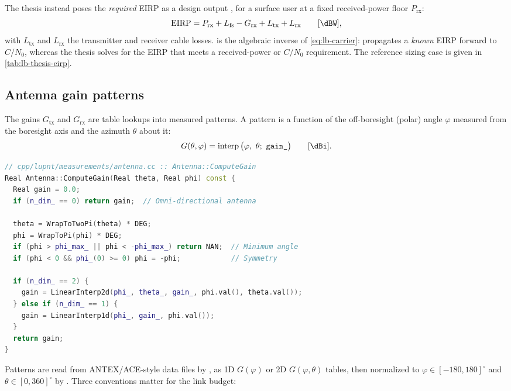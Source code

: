 The thesis instead poses the \emph{required} EIRP as a design output
\citep[Ch.~3.3, Eq.~(3.17)]{iiyama2026thesis}, for a surface user at a fixed
received-power floor $P_\mathrm{rx}$:
\begin{equation}
  \mathrm{EIRP}
  =
  P_\mathrm{rx}
  + L_\mathrm{fs}
  - G_\mathrm{rx}
  + L_\mathrm{tx}
  + L_\mathrm{rx}
  \qquad [\si{\dBW}],
  \label{eq:lb-eirp-required}
\end{equation}
with $L_\mathrm{tx}$ and $L_\mathrm{rx}$ the transmitter and receiver cable
losses.   is the algebraic inverse of
\cref{eq:lb-carrier}: \lupnt{} propagates a \emph{known} EIRP forward to
$C/N_0$, whereas the thesis solves for the EIRP that meets a received-power or
$C/N_0$ requirement.  The reference sizing case is given in
\cref{tab:lb-thesis-eirp}.

\subsection{Antenna gain patterns}
\label{sec:lb-gain}

The gains $G_\mathrm{tx}$ and $G_\mathrm{rx}$ are table lookups into measured
patterns.  A pattern is a function of the off-boresight (polar) angle
$\varphi$ measured from the boresight axis and the azimuth $\theta$ about it:
\begin{equation}
  G(\theta, \varphi)
  =
  \operatorname{interp}\big(\varphi,\ \theta;\ \code{gain\_}\big)
  \qquad [\si{\dBi}].
  \label{eq:lb-gain}
\end{equation}

\begin{lstlisting}[language=cpp, caption={Pattern lookup with the coverage cut
and the mirror-symmetry fold.}, label={lst:lb-gain}]
// cpp/lupnt/measurements/antenna.cc :: Antenna::ComputeGain
Real Antenna::ComputeGain(Real theta, Real phi) const {
  Real gain = 0.0;
  if (n_dim_ == 0) return gain;  // Omni-directional antenna

  theta = WrapToTwoPi(theta) * DEG;
  phi = WrapToPi(phi) * DEG;
  if (phi > phi_max_ || phi < -phi_max_) return NAN;  // Minimum angle
  if (phi < 0 && phi_(0) >= 0) phi = -phi;            // Symmetry

  if (n_dim_ == 2) {
    gain = LinearInterp2d(phi_, theta_, gain_, phi.val(), theta.val());
  } else if (n_dim_ == 1) {
    gain = LinearInterp1d(phi_, gain_, phi.val());
  }
  return gain;
}
\end{lstlisting}

Patterns are read from ANTEX/ACE-style data files by
, as 1D $G(\varphi)$ or 2D
$G(\varphi,\theta)$ tables, then normalized to
$\varphi \in [-180, 180]^\circ$ and $\theta \in [0, 360]^\circ$ by
.  Three conventions matter for the link budget:

